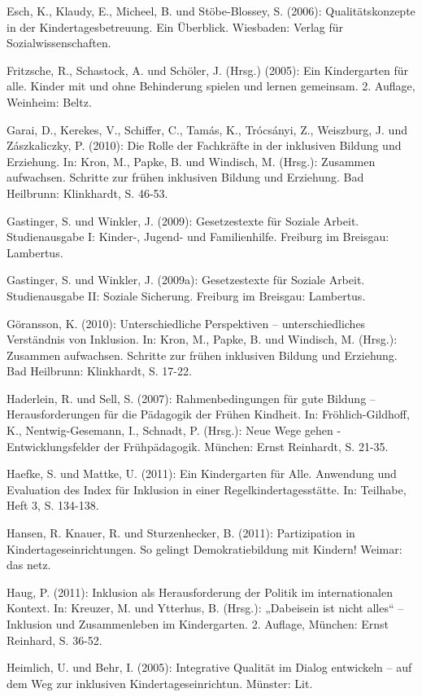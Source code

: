 Esch, K., Klaudy, E., Micheel, B. und Stöbe-Blossey, S. (2006): Qualitätskonzepte in der Kindertagesbetreuung. Ein Überblick. Wiesbaden: Verlag für Sozialwissenschaften.

Fritzsche, R., Schastock, A. und Schöler, J. (Hrsg.) (2005): Ein Kindergarten für alle. Kinder mit und ohne Behinderung spielen und lernen gemeinsam. 2. Auflage, Weinheim: Beltz. 

Garai, D., Kerekes, V., Schiffer, C., Tamás,
K., Trócsányi, Z., Weiszburg, J. und Zászkaliczky, P. (2010):
Die Rolle der Fachkräfte in der inklusiven Bildung und
Erziehung. In: Kron, M., Papke, B. und Windisch, M. (Hrsg.): Zusammen aufwachsen. Schritte zur frühen inklusiven Bildung und Erziehung. Bad Heilbrunn: Klinkhardt, S. 46-53.

Gastinger, S. und Winkler, J. (2009): Gesetzestexte für Soziale Arbeit. Studienausgabe I: Kinder-, Jugend- und Familienhilfe. Freiburg im Breisgau: Lambertus.

Gastinger, S. und Winkler, J. (2009a): Gesetzestexte für Soziale Arbeit. Studienausgabe II: Soziale Sicherung. Freiburg im Breisgau: Lambertus.

Göransson, K. (2010): Unterschiedliche Perspektiven – unterschiedliches Verständnis von Inklusion. In: Kron, M., Papke, B. und Windisch, M. (Hrsg.): Zusammen aufwachsen. Schritte zur frühen inklusiven Bildung und Erziehung. Bad Heilbrunn: Klinkhardt, S. 17-22. 

Haderlein, R. und Sell, S. (2007): Rahmenbedingungen für gute Bildung -- Herausforderungen für die Pädagogik der Frühen Kindheit. In: Fröhlich-Gildhoff, K., Nentwig-Gesemann, I., Schnadt, P. (Hrsg.): Neue Wege gehen - Entwicklungsfelder der Frühpädagogik. München: Ernst Reinhardt, S. 21-35.

Haefke, S. und Mattke, U. (2011): Ein Kindergarten für Alle. Anwendung und Evaluation des Index für Inklusion in einer Regelkindertagesstätte. In: Teilhabe, Heft 3, S. 134-138.

Hansen, R. Knauer, R. und Sturzenhecker, B. (2011): Partizipation in Kindertageseinrichtungen. So gelingt Demokratiebildung mit Kindern! Weimar: das netz.

Haug, P. (2011): Inklusion als Herausforderung der Politik im internationalen Kontext. In: Kreuzer, M. und Ytterhus, B. (Hrsg.): „Dabeisein ist nicht alles“ -- Inklusion und Zusammenleben im Kindergarten. 2. Auflage, München: Ernst Reinhard, S. 36-52.   

Heimlich, U. und Behr, I. (2005): Integrative Qualität im Dialog entwickeln – auf dem Weg zur inklusiven Kindertageseinrichtun. Münster: Lit. 

